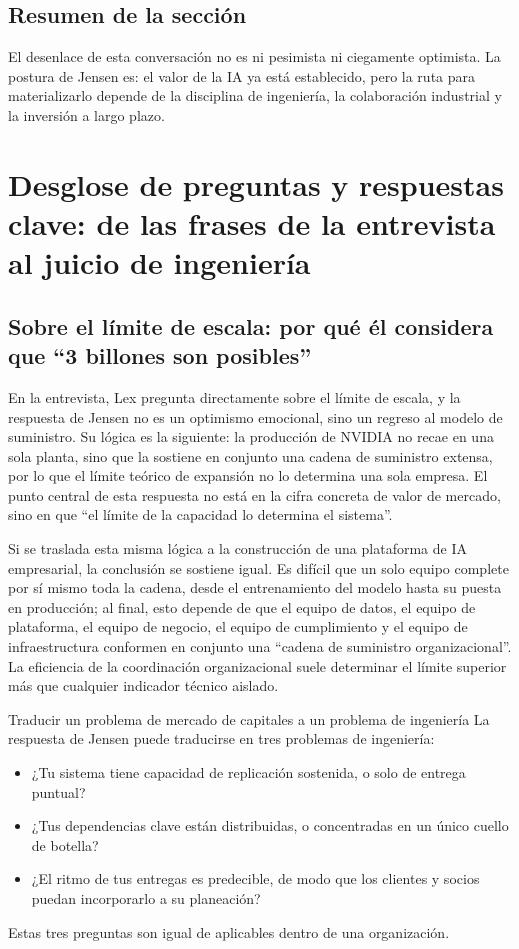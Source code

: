 \documentclass[a4paper]{article}
\begin{document}
\subsection{Resumen de la sección}

El desenlace de esta conversación no es ni pesimista ni ciegamente optimista. La postura de Jensen es: el valor de la IA ya está establecido, pero la ruta para materializarlo depende de la disciplina de ingeniería, la colaboración industrial y la inversión a largo plazo.

\section{Desglose de preguntas y respuestas clave: de las frases de la entrevista al juicio de ingeniería}

\subsection{Sobre el límite de escala: por qué él considera que ``3 billones son posibles''}

En la entrevista, Lex pregunta directamente sobre el límite de escala, y la respuesta de Jensen no es un optimismo emocional, sino un regreso al modelo de suministro. Su lógica es la siguiente: la producción de NVIDIA no recae en una sola planta, sino que la sostiene en conjunto una cadena de suministro extensa, por lo que el límite teórico de expansión no lo determina una sola empresa. El punto central de esta respuesta no está en la cifra concreta de valor de mercado, sino en que ``el límite de la capacidad lo determina el sistema''.

Si se traslada esta misma lógica a la construcción de una plataforma de IA empresarial, la conclusión se sostiene igual. Es difícil que un solo equipo complete por sí mismo toda la cadena, desde el entrenamiento del modelo hasta su puesta en producción; al final, esto depende de que el equipo de datos, el equipo de plataforma, el equipo de negocio, el equipo de cumplimiento y el equipo de infraestructura conformen en conjunto una ``cadena de suministro organizacional''. La eficiencia de la coordinación organizacional suele determinar el límite superior más que cualquier indicador técnico aislado.

\begin{knowledgebox}{Traducir un problema de mercado de capitales a un problema de ingeniería}
La respuesta de Jensen puede traducirse en tres problemas de ingeniería:
\begin{itemize}
    \item ¿Tu sistema tiene capacidad de replicación sostenida, o solo de entrega puntual?
    \item ¿Tus dependencias clave están distribuidas, o concentradas en un único cuello de botella?
    \item ¿El ritmo de tus entregas es predecible, de modo que los clientes y socios puedan incorporarlo a su planeación?
\end{itemize}
Estas tres preguntas son igual de aplicables dentro de una organización.
\end{knowledgebox}
\end{document}

